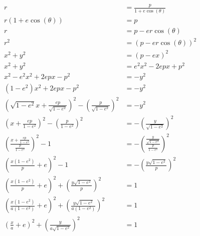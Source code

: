 \documentclass[../basicOrbitalDynamics.tex]{subfiles}
\begin{document}
\begin{align*}
    r                                                                                          & =\frac{p}{1+e\cos(\theta)}                                      \\
    r(1+e\cos(\theta))                                                                         & = p                                                             \\
    r                                                                                          & =p-er\cos(\theta)                                               \\
    r^2                                                                                        & =(p-er\cos(\theta))^2                                           \\
    x^2+y^2                                                                                    & =(p-ex)^2                                                       \\
    x^2+y^2                                                                                    & =e^2x^2-2epx+p^2                                                \\
    x^2-e^2x^2+2epx-p^2                                                                        & =-y^2                                                           \\
    (1-e^2)x^2+2epx-p^2                                                                        & =-y^2                                                           \\
    \left(\sqrt{1-e^2}x+\frac{ep}{\sqrt{1-e^2}}\right)^2-\left(\frac{p}{\sqrt{1-e^2}}\right)^2 & =-y^2                                                           \\
    \left(x+\frac{ep}{1-e^2}\right)^2-\left(\frac{p}{1-e^2}\right)^2                           & =-\left(\frac{y}{\sqrt{1-e^2}}\right)^2                         \\
    \left(\frac{x+\frac{ep}{1-e^2}}{\frac{p}{1-e^2}}\right)^2-1                                & =-\left(\frac{\frac{y}{\sqrt{1-e^2}}}{\frac{p}{1-e^2}}\right)^2 \\
    \left(\frac{x(1-e^2)}{p}+e\right)^2-1                                                      & =-\left(\frac{y\sqrt{1-e^2}}{p}\right)^2                        \\
    \left(\frac{x(1-e^2)}{p}+e\right)^2+\left(\frac{y\sqrt{1-e^2}}{p}\right)^2                 & =1                                                              \\
    \left(\frac{x(1-e^2)}{a(1-e^2)}+e\right)^2+\left(\frac{y\sqrt{1-e^2}}{a(1-e^2)}\right)^2   & =1                                                              \\
    \left(\frac{x}{a}+e\right)^2+\left(\frac{y}{a\sqrt{1-e^2}}\right)^2                        & =1                                                              \\
\end{align*}
\end{document}
